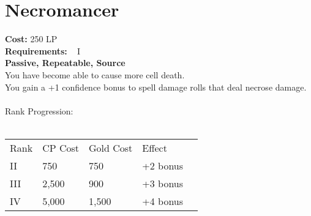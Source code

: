 \section{Necromancer}\label{perk:necromancer}
\textbf{Cost:} 250 LP\\
\textbf{Requirements:} ~ I\\
\textbf{Passive, Repeatable, Source}\\
You have become able to cause more cell death.\\
You gain a +1 confidence bonus to spell damage rolls that deal necrose damage.\\
\\
Rank Progression:\\
\\
\begin{tabular}{l | l | l | l | l}
    Rank & CP Cost & Gold Cost &  Effect\\
    II & 750 & 750 & +2 bonus\\
    III & 2,500 & 900 & +3 bonus\\
    IV & 5,000 & 1,500 & +4 bonus\\
\end{tabular}
